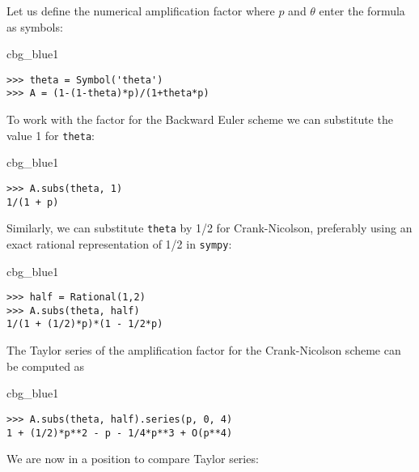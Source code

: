 \documentclass[graybox,sectrefs,envcountresetchap,open=right,final]{svmonodo}
\newenvironment{_cod_tight}[1]{
   \def\FrameCommand{\colorbox{#1}}
   \FrameRule0.6pt\MakeFramed {\FrameRestore}\vskip3mm}
   {\vskip0mm\endMakeFramed}
\newenvironment{cod}[1]{
\bgroup\rmfamily
\fboxsep=0mm\relax
\begin{_cod_tight}{#1}
\list{}{\parsep=-2mm\parskip=0mm\topsep=0pt\leftmargin=2mm
\rightmargin=2\leftmargin\leftmargin=4pt\relax}
\item\relax}
{\endlist\end{_cod_tight}\egroup}
\begin{document}
Let us define the numerical amplification factor where $p$ and $\theta$
enter the formula as symbols:
\begin{cod}{cbg_blue1}\begin{Verbatim}[numbers=none,fontsize=\fontsize{9pt}{9pt},baselinestretch=0.95,xleftmargin=2mm]
>>> theta = Symbol('theta')
>>> A = (1-(1-theta)*p)/(1+theta*p)
\end{Verbatim}
\end{cod}
\noindent
To work with the factor for the Backward Euler scheme we
can substitute the value 1 for \texttt{theta}:

\begin{cod}{cbg_blue1}\begin{Verbatim}[numbers=none,fontsize=\fontsize{9pt}{9pt},baselinestretch=0.95,xleftmargin=2mm]
>>> A.subs(theta, 1)
1/(1 + p)
\end{Verbatim}
\end{cod}
\noindent
Similarly, we can substitute \texttt{theta} by 1/2 for Crank-Nicolson,
preferably using an exact rational representation of 1/2 in \texttt{sympy}:

\begin{cod}{cbg_blue1}\begin{Verbatim}[numbers=none,fontsize=\fontsize{9pt}{9pt},baselinestretch=0.95,xleftmargin=2mm]
>>> half = Rational(1,2)
>>> A.subs(theta, half)
1/(1 + (1/2)*p)*(1 - 1/2*p)
\end{Verbatim}
\end{cod}
\noindent

The Taylor series of the amplification factor for the Crank-Nicolson
scheme can be computed as

\begin{cod}{cbg_blue1}\begin{Verbatim}[numbers=none,fontsize=\fontsize{9pt}{9pt},baselinestretch=0.95,xleftmargin=2mm]
>>> A.subs(theta, half).series(p, 0, 4)
1 + (1/2)*p**2 - p - 1/4*p**3 + O(p**4)
\end{Verbatim}
\end{cod}
\noindent
We are now in a position to compare Taylor series:
\end{document}
